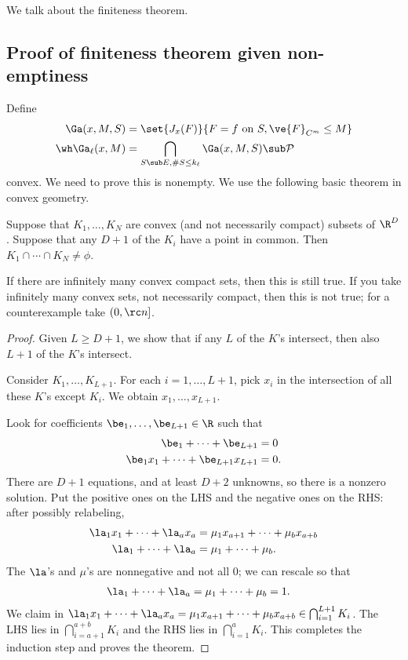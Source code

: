 We talk about the finiteness theorem. %

\subsection{Proof of finiteness theorem given non-emptiness}

Define 
\begin{align}
\Ga(x,M,S) &= \set{J_x(F)}{F=f\text{ on }S, \ve{F}_{C^m}\le M}\\
\wh \Ga_\ell(x,M) &= \bigcap_{S\sub E, \#S\le k_\ell} \Ga(x,M,S)\sub \cal P
\end{align}
convex. We need to prove this is nonempty. We use the following basic theorem in convex geometry.
\begin{thm}\label{thm:helly}
Suppose that $K_1,\ldots, K_N$ are convex (and not necessarily compact) subsets of $\R^D$. 
Suppose that any $D+1$ of the $K_i$ have a point in common. Then $K_1\cap \cdots \cap K_N\ne \phi$.
\end{thm}
If there are infinitely many convex compact sets, then this is still true.
If you take infinitely many convex sets, not necessarily compact, then this is not true; for a counterexample take $(0,\rc n]$. 
\begin{proof}
Given $L\ge D+1$, we show that if any $L$ of the $K$'s intersect, then also $L+1$ of the $K$'s intersect.

Consider $K_1,\ldots, K_{L+1}$. For each $i=1,\ldots, L+1$, pick $x_i$ in the intersection of all these $K$'s except $K_i$. 
We obtain $x_1,\ldots, x_{L+1}$. 

Look for coefficients $\be_1,\ldots, \be_{L+1}\in \R$ such that 
\begin{align}
\be_1+\cdots + \be_{L+1}&=0\\
\be_1x_1+\cdots + \be_{L+1}x_{L+1}&=0.
\end{align}
There are $D+1$ equations, and at least $D+2$ unknowns, so there is a nonzero solution. Put the positive ones on the LHS and the negative ones on the RHS: after possibly relabeling,
\begin{align}
\la_1x_1+\cdots +\la_ax_a &= \mu_1x_{a+1}+\cdots + \mu_b x_{a+b}\\
\la_1+\cdots + \la_a &= \mu_1+\cdots +\mu_b.
\end{align}
The $\la$'s and $\mu$'s are nonnegative and not all 0; we can rescale so that 
\begin{align}
\la_1+\cdots + \la_a &= \mu_1+\cdots +\mu_b=1.
\end{align}
We claim in $\la_1x_1+\cdots +\la_ax_a = \mu_1x_{a+1}+\cdots + \mu_b x_{a+b} \in \bigcap_{i=1}^{L+1}K_i$. The LHS lies in 
$\bigcap_{i=a+1}^{a+b} K_i$ and the RHS lies in $\bigcap_{i=1}^a K_i$. This completes the induction step and proves the theorem. 
\end{proof}






